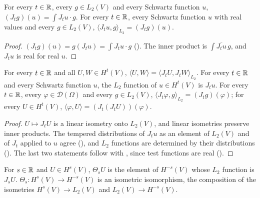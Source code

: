 \begin{lemma}
\label{lem:bessel-potential-l2-schwartz}
\leanok
{}
For every $t \in \mathbb{R}$, every $g \in L_2(V)$ and every Schwartz function $u$,
$(J_t g)(u) = \int J_t u \cdot g$. For every $t \in \mathbb{R}$, every Schwartz function $u$ with real
values and every $g \in L_2(V)$, $\langle J_t u, g \rangle_{L_2} = (J_t g)(u)$.
\end{lemma}

\begin{proof}
\leanok
$(J_t g)(u) = g(J_t u) = \int J_t u \cdot g$ (). The inner
product is $\int \overline{J_t u} \, g$, and
$J_t u$ is real for real $u$.
\end{proof}

\begin{lemma}
\label{lem:sobolev-schwartz-elements}
\leanok
{}
For every $t \in \mathbb{R}$ and all $U, W \in H^t(V)$,
$\langle U, W \rangle = \langle J_t U, J_t W \rangle_{L_2}$. For every $t \in \mathbb{R}$ and every
Schwartz function $u$, the $L_2$ function of $u \in H^t(V)$ is $J_t u$. For every $t \in \mathbb{R}$,
every $\varphi \in \mathcal D(\Omega)$ and every $g \in L_2(V)$,
$\langle J_t \varphi, g \rangle_{L_2} = (J_t g)(\varphi)$; for every $U \in H^t(V)$,
$\langle \varphi, U \rangle = (J_t (J_t U))(\varphi)$.
\end{lemma}

\begin{proof}
\leanok
$U \mapsto J_t U$ is a linear isometry onto $L_2(V)$, and linear isometries preserve inner
products. The tempered distributions of $J_t u$ as an element of $L_2(V)$ and of $J_t$ applied to
$u$ agree (), and $L_2$ functions are determined by their
distributions (). The last two statements follow with
, since
test functions are real ().
\end{proof}

\begin{definition}
\label{def:bessel-shift}
\leanok
For $s \in \mathbb{R}$ and $U \in H^s(V)$, $\Theta_s U$ is the element of $H^{-s}(V)$ whose $L_2$
function is $J_s U$. $\Theta_s : H^s(V) \to H^{-s}(V)$ is an isometric isomorphism, the
composition of the isometries $H^s(V) \to L_2(V)$ and $L_2(V) \to H^{-s}(V)$.
\end{definition}

